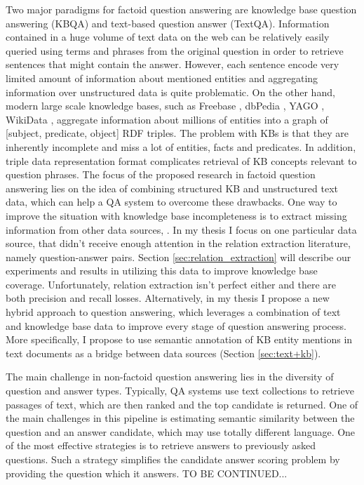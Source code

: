 Two major paradigms for factoid question answering are knowledge base question answering (KBQA) and text-based question answer (TextQA).
Information contained in a huge volume of text data on the web can be relatively easily queried using terms and phrases from the original question in order to retrieve sentences that might contain the answer.
However, each sentence encode very limited amount of information about mentioned entities and aggregating information over unstructured data is quite problematic.
On the other hand, modern large scale knowledge bases, such as Freebase \cite{Bollacker:2008:FCC:1376616.1376746}, dbPedia \cite{auer2007dbpedia}, YAGO \cite{yago3}, WikiData \cite{vrandevcic2014wikidata}, aggregate information about millions of entities into a graph of [subject, predicate, object] RDF triples.
The problem with KBs is that they are inherently incomplete and miss a lot of entities, facts and predicates.
In addition, triple data representation format complicates retrieval of KB concepts relevant to question phrases.
The focus of the proposed research in factoid question answering lies on the idea of combining structured KB and unstructured text data, which can help a QA system to overcome these drawbacks.
One way to improve the situation with knowledge base incompleteness is to extract missing information from other data sources, \eg \cite{Cafarella:2008:WEP:1453856.1453916,Cafarella:2009:WES:1519103.1519112,Dong:2014:KVW:2623330.2623623,Etzioni:2008:OIE:1409360.1409378,Gupta:2014:BOS:2732286.2732288,kushmerick1997wrapper}.
In my thesis I focus on one particular data source, that didn't receive enough attention in the relation extraction literature, namely question-answer pairs.
Section \ref{sec:relation_extraction} will describe our experiments and results in utilizing this data to improve knowledge base coverage.
Unfortunately, relation extraction isn't perfect either and there are both precision and recall losses.
Alternatively, in my thesis I propose a new hybrid approach to question answering, which leverages a combination of text and knowledge base data to improve every stage of question answering process.
More specifically, I propose to use semantic annotation of KB entity mentions in text documents as a bridge between data sources (Section \ref{sec:text+kb}).

The main challenge in non-factoid question answering lies in the diversity of question and answer types.
Typically, QA systems use text collections to retrieve passages of text, which are then ranked and the top candidate is returned.
One of the main challenges in this pipeline is estimating semantic similarity between the question and an answer candidate, which may use totally different language.
One of the most effective strategies is to retrieve answers to previously asked questions.
Such a strategy simplifies the candidate answer scoring problem by providing the question which it answers.
TO BE CONTINUED...

